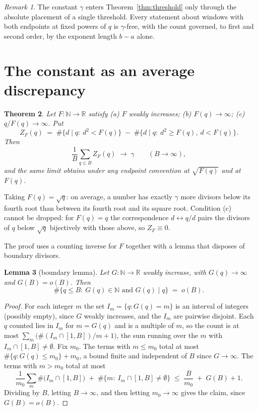 \documentclass[11pt]{amsart}
\newtheorem{theorem}{Theorem}
\newtheorem{lemma}[theorem]{Lemma}
\theoremstyle{remark}
\newtheorem{remark}[theorem]{Remark}
\newcommand{\N}{\mathbb{N}}
\newcommand{\R}{\mathbb{R}}
\newcommand{\eul}{\gamma}
\begin{document}
\begin{remark}\label{rem:gammafree}
The constant $\eul$ enters Theorem~\ref{thm:threshold} only through the
absolute placement of a single threshold.  Every statement about
windows with both endpoints at fixed powers of $q$ is $\eul$-free, with
the count governed, to first and second order, by the exponent length
$b-a$ alone.
\end{remark}

\section{The constant as an average discrepancy}\label{sec:gamma}

\begin{theorem}\label{thm:gamma}
Let $F:\N\to\R$ satisfy
\textup{(a)} $F$ weakly increases;
\textup{(b)} $F(q)\to\infty$;
\textup{(c)} $q/F(q)\to\infty$.
Put
\[
Z_{F}(q)\;=\;
\#\{d\mid q:\ d^{2}<F(q)\}\;-\;\#\{d\mid q:\ d^{2}\ge F(q),\ d<F(q)\}.
\]
Then
\[
\frac1B\sum_{q\le B}Z_{F}(q)\;\longrightarrow\;\eul
\qquad(B\to\infty),
\]
and the same limit obtains under any endpoint convention at
$\sqrt{F(q)}$ and at $F(q)$.
\end{theorem}

Taking $F(q)=\sqrt q$: on average, a number has exactly $\eul$ more
divisors below its fourth root than between its fourth root and its
square root.  Condition (c) cannot be dropped: for $F(q)=q$ the
correspondence $d\leftrightarrow q/d$ pairs the divisors of $q$ below
$\sqrt q$ bijectively with those above, so $Z_{F}\equiv0$.

The proof uses a counting inverse for $F$ together with a lemma that
disposes of boundary divisors.

\begin{lemma}[boundary lemma]\label{lem:boundary}
Let $G:\N\to\R$ weakly increase, with $G(q)\to\infty$ and $G(B)=o(B)$.
Then
\[
\#\{q\le B:\ G(q)\in\N \text{ and } G(q)\mid q\}\;=\;o(B).
\]
\end{lemma}

\begin{proof}
For each integer $m$ the set $I_{m}=\{q:G(q)=m\}$ is an interval of
integers (possibly empty), since $G$ weakly increases, and the $I_{m}$
are pairwise disjoint.  Each $q$ counted lies in $I_{m}$ for $m=G(q)$
and is a multiple of $m$, so the count is at most
$\sum_{m}\bigl(\#(I_{m}\cap[1,B])/m+1\bigr)$, the sum running over the
$m$ with $I_{m}\cap[1,B]\ne\emptyset$.  Fix $m_{0}$.  The terms with
$m\le m_{0}$ total at most $\#\{q:G(q)\le m_{0}\}+m_{0}$, a bound
finite and independent of $B$ since $G\to\infty$.  The terms with
$m>m_{0}$ total at most
\[
\frac{1}{m_{0}}\sum_{m}\#\bigl(I_{m}\cap[1,B]\bigr)
\;+\;\#\{m:\ I_{m}\cap[1,B]\ne\emptyset\}
\;\le\;\frac{B}{m_{0}}\;+\;G(B)+1 .
\]
Dividing by $B$, letting $B\to\infty$, and then letting
$m_{0}\to\infty$ gives the claim, since $G(B)=o(B)$.
\end{proof}
\end{document}
